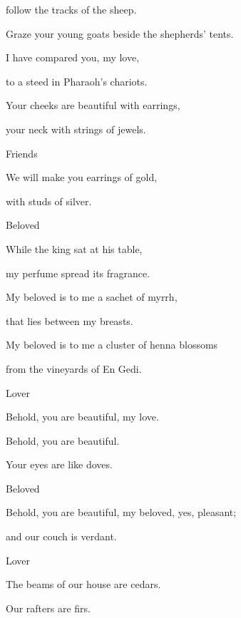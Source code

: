 {\par }{\QB follow the tracks of the sheep.
\par }{\QB Graze your young goats beside the shepherds’ tents.
\par }{\BB \par }{\Q {}I have compared you, my love,
\par }{\QB to a steed in Pharaoh’s chariots.
\par }{\Q {}Your cheeks are beautiful with earrings,
\par }{\QB your neck with strings of jewels.
\par }{\SP Friends
\par }{\Q {}We will make you earrings of gold,
\par }{\QB with studs of silver.
\par }{\SP Beloved
\par }{\Q {}While the king sat at his table,
\par }{\QB my perfume spread its fragrance.
\par }{\Q {}My beloved is to me a sachet of myrrh,
\par }{\QB that lies between my breasts.
\par }{\Q {}My beloved is to me a cluster of henna blossoms
\par }{\QB from the vineyards of En Gedi.
\par }{\SP Lover
\par }{\Q {}Behold, you are beautiful, my love.
\par }{\QB Behold, you are beautiful.
\par }{\QB Your eyes are like doves.
\par }{\SP Beloved
\par }{\Q {}Behold, you are beautiful, my beloved, yes, pleasant;
\par }{\QB and our couch is verdant.
\par }{\SP Lover
\par }{\Q {}The beams of our house are cedars.
\par }{\QB Our rafters are firs.

}
